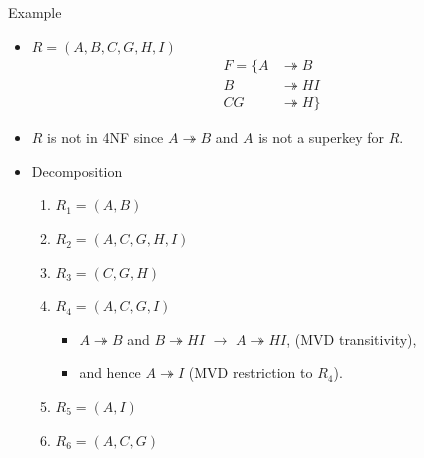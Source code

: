 \documentclass{beamer}
\begin{document}
\begin{frame}{Example}
    \footnotesize
    \begin{itemize}
        \item $R =(A, B, C, G, H, I)$ \\
            \begin{equation*}
                \begin{align*}
                    F = \{  A  &\twoheadrightarrow B  \\
                            B  &\twoheadrightarrow HI \\
                            CG &\twoheadrightarrow H \}
                \end{align*}
            \end{equation*}

        \item $R$ is not in 4NF since $A \twoheadrightarrow B$ and $A$ is not a superkey for $R$.

        \item Decomposition
            \begin{enumerate}
                \item $R_1 = (A, B)$            \quad [$R_1$ is in 4NF] \pause
                \item $R_2 = (A, C, G, H, I)$    \pause
                \item $R_3 = (C, G, H)$         \quad [$R_3$ is in 4NF] \pause
                \item $R_4 = (A, C, G, I)$       \pause
                    \begin{itemize}
                        \item $A \twoheadrightarrow B$ and $B \twoheadrightarrow HI$ $\longrightarrow$ $A \twoheadrightarrow HI$, (MVD transitivity),
                        \item and hence $A \twoheadrightarrow I$ (MVD restriction to $R_4$). \pause
                    \end{itemize}
                \item $R_5 = (A, I)$            \quad [$R_5$ is in 4NF] \pause
                \item $R_6 = (A, C, G)$         \quad [$R_6$ is in 4NF]
            \end{enumerate}
    \end{itemize}
\end{frame}
\end{document}

